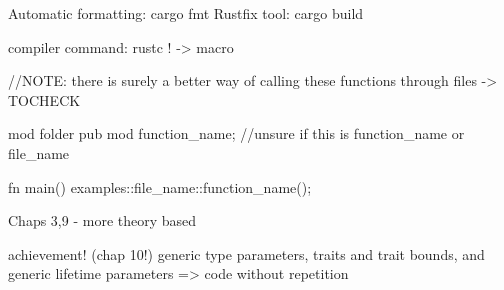 Automatic formatting: cargo fmt
Rustfix tool: cargo build

compiler command: rustc
! -> macro

//NOTE: there is surely a better way of calling these functions through files -> TOCHECK


mod folder {pub mod function_name;} //unsure if this is function_name or file_name

fn main() {
    examples::file_name::function_name(); 
}

Chaps 3,9 - more theory based

achievement! (chap 10!) generic type parameters, traits and trait bounds, and generic lifetime parameters => code without repetition 